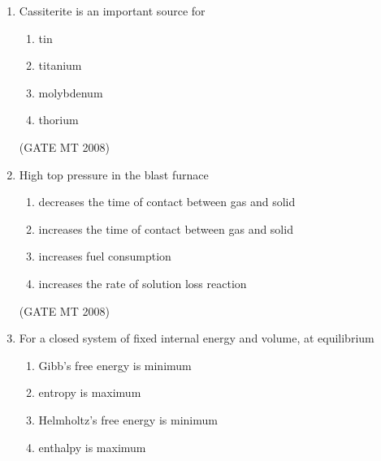 \documentclass[11pt, letterpaper]{article}
\theoremstyle{remark}
\begin{document}
\begin{enumerate}
\begin{multicols}{4}
\begin{enumerate}
\item $0$
\item $1$
\item $3$ 
\item tends to $\infty$
\end{enumerate}
\end{multicols}


\hfill(GATE MT 2008)

\item Cassiterite is an important source for

\begin{multicols}{4}
\begin{enumerate}
\item tin
\item titanium 
\item molybdenum
\item thorium
\end{enumerate}
\end{multicols}

\hfill(GATE MT 2008)

\item High top pressure in the blast furnace

\begin{multicols}{1}
\begin{enumerate}
\item decreases the time of contact between gas and solid
\item increases the time of contact between gas and solid 
\item increases fuel consumption
\item increases the rate of solution loss reaction
\end{enumerate}
\end{multicols}

\hfill (GATE MT 2008)

\item For a closed system of fixed internal energy and volume, at equilibrium

\begin{multicols}{2}
\begin{enumerate}
\item Gibb's free energy is minimum
\item entropy is maximum
\item Helmholtz's free energy is minimum
\item enthalpy is maximum
\end{enumerate}
\end{multicols}


\end{enumerate}
\end{document}
